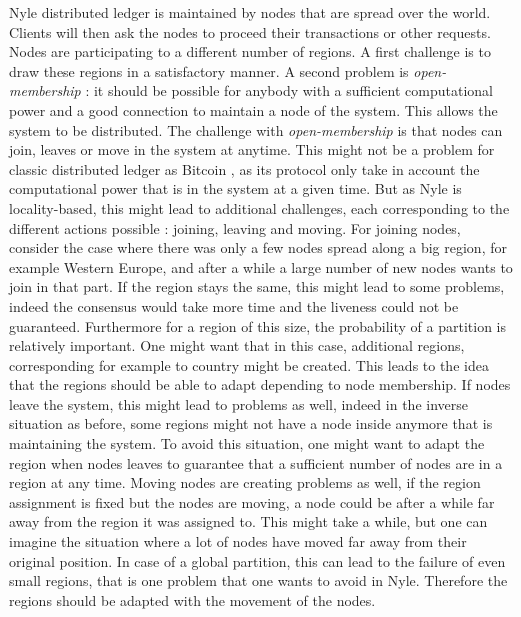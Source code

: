 \documentclass[a4paper,11pt,oneside]{report}
\begin{document}
Nyle distributed ledger is maintained by nodes that are spread over the world.
Clients will then ask the nodes to proceed their transactions or other
requests. Nodes are participating to a different number of regions. A first
challenge is to draw these regions in a satisfactory manner. A second problem
is \textit{open-membership} : it should be possible for anybody with a
sufficient computational power and a good connection to maintain a node of the
system. This allows the system to be distributed. The challenge with
\textit{open-membership} is that nodes can join, leaves or move in the system
at anytime. This might not be a problem for classic distributed ledger as
Bitcoin \cite{Bitcoin}, as its protocol only take in account the computational
power that is in the system at a given time. But as Nyle is locality-based,
this might lead to additional challenges, each corresponding to the different
actions possible : joining, leaving and moving. For joining nodes, consider the
case where there was only a few nodes spread along a big region, for example
Western Europe, and after a while a large number of new nodes wants to join in
that part. If the region stays the same, this might lead to some problems,
indeed the consensus would take more time and the liveness could not be
guaranteed. Furthermore for a region of this size, the probability of a
partition is relatively important. One might want that in this case, additional
regions, corresponding for example to country might be created. This leads to
the idea that the regions should be able to adapt depending to node membership.
If nodes leave the system, this might lead to problems as well, indeed in the
inverse situation as before, some regions might not have a node inside anymore
that is maintaining the system. To avoid this situation, one might want to
adapt the region when nodes leaves to guarantee that a sufficient number of
nodes are in a region at any time. Moving nodes are creating problems as well,
if the region assignment is fixed but the nodes are moving, a node could be
after a while far away from the region it was assigned to. This might take a
while, but one can imagine the situation where a lot of nodes have moved far
away from their original position. In case of a global partition, this can lead
to the failure of even small regions, that is one problem that one wants to
avoid in Nyle. Therefore the regions should be adapted with the movement of the
nodes. 
\end{document}
